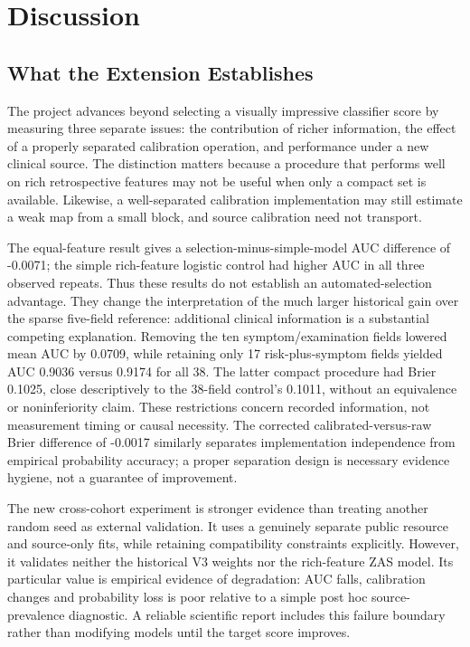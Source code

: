 \documentclass[conference]{IEEEtran}
\begin{document}
\section{Discussion}
\subsection{What the Extension Establishes}
The project advances beyond selecting a visually impressive classifier score by measuring three separate issues: the contribution of richer information, the effect of a properly separated calibration operation, and performance under a new clinical source. The distinction matters because a procedure that performs well on rich retrospective features may not be useful when only a compact set is available. Likewise, a well-separated calibration implementation may still estimate a weak map from a small block, and source calibration need not transport.

The equal-feature result gives a selection-minus-simple-model AUC difference of -0.0071; the simple rich-feature logistic control had higher AUC in all three observed repeats. Thus these results do not establish an automated-selection advantage. They change the interpretation of the much larger historical gain over the sparse five-field reference: additional clinical information is a substantial competing explanation. Removing the ten symptom/examination fields lowered mean AUC by 0.0709, while retaining only 17 risk-plus-symptom fields yielded AUC 0.9036 versus 0.9174 for all 38. The latter compact procedure had Brier 0.1025, close descriptively to the 38-field control's 0.1011, without an equivalence or noninferiority claim. These restrictions concern recorded information, not measurement timing or causal necessity. The corrected calibrated-versus-raw Brier difference of -0.0017 similarly separates implementation independence from empirical probability accuracy; a proper separation design is necessary evidence hygiene, not a guarantee of improvement.

The new cross-cohort experiment is stronger evidence than treating another random seed as external validation. It uses a genuinely separate public resource and source-only fits, while retaining compatibility constraints explicitly. However, it validates neither the historical V3 weights nor the rich-feature ZAS model. Its particular value is empirical evidence of degradation: AUC falls, calibration changes and probability loss is poor relative to a simple post hoc source-prevalence diagnostic. A reliable scientific report includes this failure boundary rather than modifying models until the target score improves.
\end{document}
